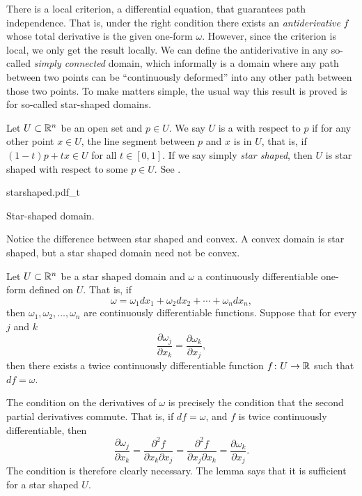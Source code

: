 There is a local criterion, a differential equation, that guarantees
path independence.  That is, under the right condition there exists
an \emph{antiderivative} $f$ whose total derivative is the given one-form
$\omega$.  However, since the criterion is local, we only get the result
locally.  We can define the antiderivative in any so-called
\emph{simply connected} domain, which informally is a domain where
any path between two points can be ``continuously deformed''
into any other path
between those two points.  To make matters simple, the usual way
this result is proved is for so-called star-shaped domains.

\begin{defn}
Let $U \subset {\mathbb{R}}^n$ be an open set and $p \in U$.  We say $U$ is
a \emph{}
with respect to $p$ if for any other point $x \in U$,
the line segment between $p$ and $x$ is in $U$, that is, if
$(1-t)p + tx \in U$ for all $t \in [0,1]$.
If we say simply \emph{star shaped}, then $U$ is star shaped with respect to
some $p \in U$.  See .
\end{defn}

\begin{myfigureht}
{starshaped.pdf_t}
\caption{Star-shaped domain.\label{fig:starshaped}}
\end{myfigureht}

Notice the difference between star shaped and convex.  A convex domain is
star shaped, but a star shaped domain need not be convex.

\begin{thm}
Let $U \subset {\mathbb{R}}^n$ be a star shaped domain and $\omega$ a continuously
differentiable one-form defined on $U$.  That is, if
\begin{equation*}
\omega =
\omega_1 dx_1 +
\omega_2 dx_2 + \cdots +
\omega_n dx_n ,
\end{equation*}
then $\omega_1,\omega_2,\ldots,\omega_n$ are continuously differentiable
functions.  Suppose that for every $j$ and $k$
\begin{equation*}
\frac{\partial \omega_j}{\partial x_k} = \frac{\partial \omega_k}{\partial x_j} ,
\end{equation*}
then there exists a twice continuously differentiable function $f \colon U
\to {\mathbb{R}}$
such that $df = \omega$.
\end{thm}

The condition on the derivatives of $\omega$ is precisely the condition
that the second partial derivatives commute.  That is, if $df = \omega$,
and $f$ is twice continuously differentiable, then
\begin{equation*}
\frac{\partial \omega_j}{\partial x_k}
=
\frac{\partial^2 f}{\partial x_k \partial x_j} 
=
\frac{\partial^2 f}{\partial x_j \partial x_k} 
=
\frac{\partial \omega_k}{\partial x_j} .
\end{equation*}
The condition is therefore clearly necessary.  The lemma says that it is
sufficient for a star shaped $U$.

